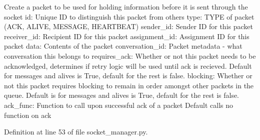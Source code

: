 \begin{DoxyVerb}Create a packet to be used for holding information before it is
sent through the socket
id:               Unique ID to distinguish this packet from others
type:             TYPE of packet (ACK, ALIVE, MESSAGE, HEARTBEAT)
sender_id:        Sender ID for this packet
receiver_id:      Recipient ID for this packet
assignment_id:    Assignment ID for this packet
data:             Contents of the packet
conversation_id:  Packet metadata - what conversation this belongs to
requires_ack:     Whether or not this packet needs to be acknowledged,
           determines if retry logic will be used until ack is
           recieved. Default for messages and alives is True,
           default for the rest is false.
blocking:         Whether or not this packet requires blocking to
           remain in order amongst other packets in the queue.
           Default is for messages and alives is True, default
           for the rest is false.
ack_func:         Function to call upon successful ack of a packet
           Default calls no function on ack
\end{DoxyVerb}
 

Definition at line 53 of file socket\+\_\+manager.\+py.


